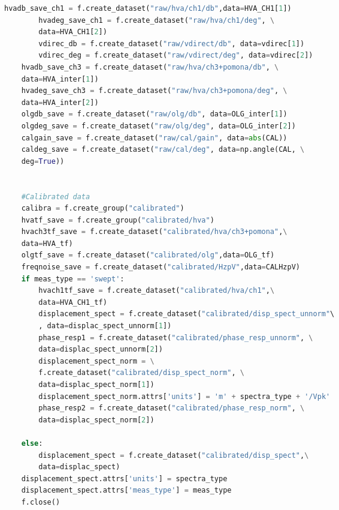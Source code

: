 \begin{spacing}{1}
\begin{lstlisting}[frame=single, language=Python]
        hvadb_save_ch1 = f.create_dataset("raw/hva/ch1/db",data=HVA_CH1[1])
        hvadeg_save_ch1 = f.create_dataset("raw/hva/ch1/deg", \
        data=HVA_CH1[2])
        vdirec_db = f.create_dataset("raw/vdirect/db", data=vdirec[1])
        vdirec_deg = f.create_dataset("raw/vdirect/deg", data=vdirec[2])
    hvadb_save_ch3 = f.create_dataset("raw/hva/ch3+pomona/db", \
    data=HVA_inter[1])
    hvadeg_save_ch3 = f.create_dataset("raw/hva/ch3+pomona/deg", \
    data=HVA_inter[2])
    olgdb_save = f.create_dataset("raw/olg/db", data=OLG_inter[1])
    olgdeg_save = f.create_dataset("raw/olg/deg", data=OLG_inter[2])
    calgain_save = f.create_dataset("raw/cal/gain", data=abs(CAL))
    caldeg_save = f.create_dataset("raw/cal/deg", data=np.angle(CAL, \
    deg=True))


    #Calibrated data
    calibra = f.create_group("calibrated")
    hvatf_save = f.create_group("calibrated/hva")
    hvach3tf_save = f.create_dataset("calibrated/hva/ch3+pomona",\
    data=HVA_tf)
    olgtf_save = f.create_dataset("calibrated/olg",data=OLG_tf)
    freqnoise_save = f.create_dataset("calibrated/HzpV",data=CALHzpV)
    if meas_type == 'swept':
        hvach1tf_save = f.create_dataset("calibrated/hva/ch1",\
        data=HVA_CH1_tf)
        displacement_spect = f.create_dataset("calibrated/disp_spect_unnorm"\
        , data=displac_spect_unnorm[1])
        phase_resp1 = f.create_dataset("calibrated/phase_resp_unnorm", \
        data=displac_spect_unnorm[2])
        displacement_spect_norm = \
        f.create_dataset("calibrated/disp_spect_norm", \
        data=displac_spect_norm[1])
        displacement_spect_norm.attrs['units'] = 'm' + spectra_type + '/Vpk'
        phase_resp2 = f.create_dataset("calibrated/phase_resp_norm", \
        data=displac_spect_norm[2])

    else:
        displacement_spect = f.create_dataset("calibrated/disp_spect",\
        data=displac_spect)
    displacement_spect.attrs['units'] = spectra_type
    displacement_spect.attrs['meas_type'] = meas_type
    f.close()
\end{lstlisting} \end{spacing}

